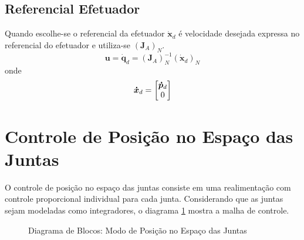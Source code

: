 \subsection{Referencial Efetuador} \label{sec:openloopefct}
Quando escolhe-se o referencial da efetuador $\bm{\dot{x}}_d$ é velocidade desejada expressa no referencial do efetuador e utiliza-se $(\bm{J}_{A})_N$.
\begin{equation}
\bm{u} = \bm{\dot{q}}_d = (\bm{J}_{A})_N^{-1} (\bm{\dot{x}}_d)_N
\end{equation}
onde 
\begin{equation}
\bm{\dot{x}}_d = \begin{bmatrix}\bm{\dot{p}}_d \\ 0\end{bmatrix}
\end{equation}

\section{Controle de Posição no Espaço das Juntas} \label{sec:position_joint}
O controle de posição no espaço das juntas consiste em uma realimentação com controle proporcional individual para cada junta. Considerando que as juntas sejam modeladas como integradores, o diagrama \ref{fig:pos_juntas} mostra a malha de controle.

\begin{figure}[h!]
\centering
{}
\caption{Diagrama de Blocos: Modo de Posição no Espaço das Juntas}
\label{fig:pos_juntas}
\end{figure}

